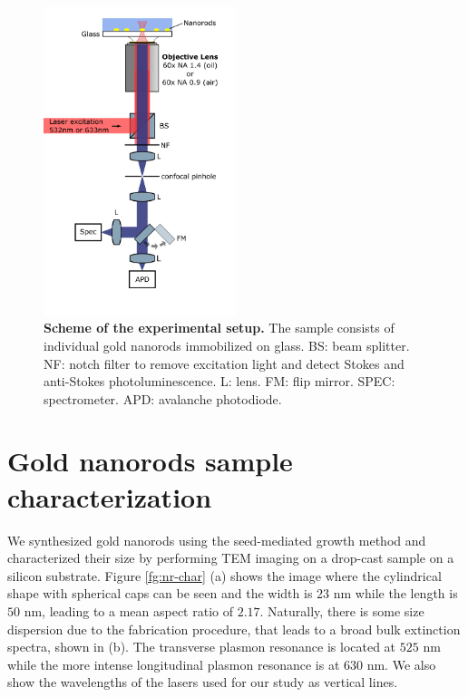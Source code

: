 \documentclass[journal=nalefd,manuscript=letter]{achemso}
\begin{document}
\begin{figure}[htp] \centering
\includegraphics[width=0.5\textwidth]{Figures/Supplementary/02_Setup/setup.png}
\caption{\textbf{Scheme of the experimental setup.} The sample consists of individual gold nanorods immobilized on glass. BS: beam splitter. NF: notch filter to remove excitation light and detect Stokes and anti-Stokes photoluminescence. L: lens. FM: flip mirror. SPEC: spectrometer. APD: avalanche photodiode.}
	\label{fig:setup}
\end{figure}

\pagebreak

\section{Gold nanorods sample characterization}

We synthesized gold nanorods using the seed-mediated growth method \cite{nikoobakht2003preparation} 
and characterized their size by performing TEM imaging on a drop-cast sample on a silicon substrate. 
Figure \ref{fg:nr-char} (a) shows the image where the cylindrical shape with spherical caps can be seen 
and the width is $23$ nm while the length is $50$ nm, 
leading to a mean aspect ratio of $2.17$. 
Naturally, there is some size dispersion due to the fabrication procedure, that leads to a broad bulk extinction 
spectra, shown in (b). The transverse plasmon resonance is located at $525$ nm while the more intense 
longitudinal plasmon resonance is at $630$ nm. We also show the wavelengths of the lasers used for 
our study as vertical lines. 
\end{document}
